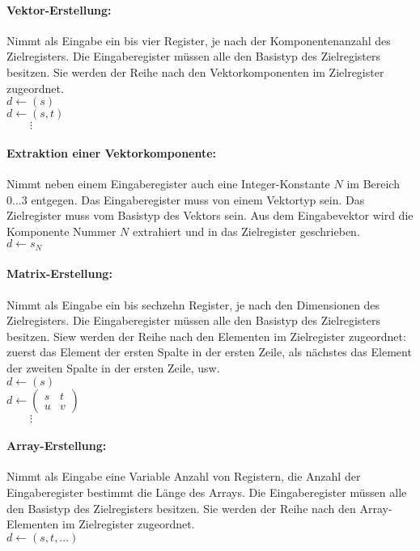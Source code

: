 \documentclass[twoside,a4paper,fleqn,12pt]{article}
\begin{document}
\paragraph{Vektor-Erstellung:} Nimmt als Eingabe ein bis vier Register, je nach der Komponentenanzahl des Zielregisters. Die Eingaberegister müssen alle
den Basistyp des Zielregisters besitzen. Sie werden der Reihe nach den Vektorkomponenten im Zielregister zugeordnet.
\\\hspace*{1cm}$d \gets (s)$
\\\hspace*{1cm}$d \gets (s, t)$
\\\hspace*{1cm}$\phantom{d \gets}\vdots$

\paragraph{Extraktion einer Vektorkomponente:} Nimmt neben einem Eingaberegister auch eine Integer-Konstante $N$ im Bereich $0 \dots 3$ entgegen.
Das Eingaberegister muss von einem Vektortyp sein. Das Zielregister muss vom Basistyp des Vektors sein.
Aus dem Eingabevektor wird die Komponente Nummer $N$ extrahiert und in das Zielregister geschrieben.
\\\hspace*{1cm}$d \gets s_N$

\paragraph{Matrix-Erstellung:} Nimmt als Eingabe ein bis sechzehn Register, je nach den Dimensionen des Zielregisters. Die Eingaberegister müssen alle
den Basistyp des Zielregisters besitzen. Siew werden der Reihe nach den Elementen im Zielregister zugeordnet: zuerst das Element der ersten Spalte in der ersten Zeile,
als nächstes das Element der zweiten Spalte in der ersten Zeile, usw.
\\\hspace*{1cm}$d \gets \left(s\right)$
\\\hspace*{1cm}$d \gets \left(\begin{array}{cc}s&t\\u&v\end{array}\right)$
\\\hspace*{1cm}$\phantom{d \gets}\vdots$

\paragraph{Array-Erstellung:} Nimmt als Eingabe eine Variable Anzahl von Registern, die Anzahl der Eingaberegister bestimmt die Länge des Arrays.
Die Eingaberegister müssen alle den Basistyp des Zielregisters besitzen. Sie werden der Reihe nach den Array-Elementen im Zielregister zugeordnet.
\\\hspace*{1cm}$d \gets (s, t, \dots)$
\end{document}
